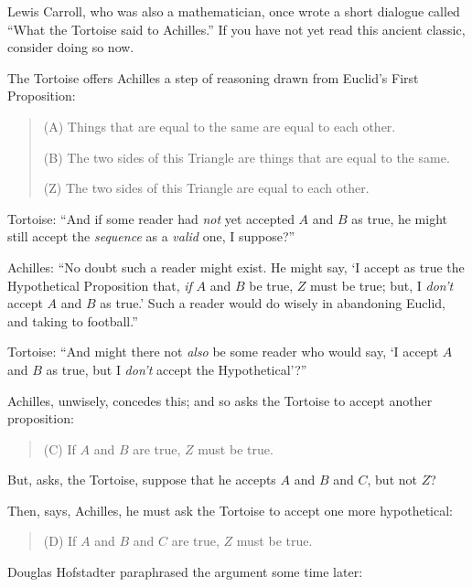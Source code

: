 \myendsectiontext


\bigskip


{
 Lewis Carroll, who was also a mathematician, once wrote a short
dialogue called ``What the Tortoise said to
Achilles.'' If you have not yet read this ancient
classic, consider doing so now. }

{
 The Tortoise offers Achilles a step of reasoning drawn from
Euclid's First Proposition:}

\begin{quotation}
{
 (A) Things that are equal to the same are equal to each other.}

{
 (B) The two sides of this Triangle are things that are equal to
the same.}

{
  (Z) The two sides of this Triangle are equal to each other.}
\end{quotation}

{
 Tortoise: ``And if some reader had \textit{not}
yet accepted $A$ and $B$ as true, he might still accept the
\textit{sequence} as a \textit{valid} one, I
suppose?''}

{
 Achilles: ``No doubt such a reader might exist.
He might say, `I accept as true the Hypothetical
Proposition that, \textit{if} $A$ and $B$ be true, $Z$ must be true; but, I
\textit{don't} accept $A$ and $B$ as true.'
Such a reader would do wisely in abandoning Euclid, and taking to
football.''}

{
 Tortoise: ``And might there not \textit{also} be
some reader who would say, `I accept $A$ and $B$ as true,
but I \textit{don't} accept the
Hypothetical'?''}

{
 Achilles, unwisely, concedes this; and so asks the Tortoise to
accept another proposition:}

\begin{quotation}
{
  (C) If $A$ and $B$ are true, $Z$ must be true.}
\end{quotation}

{
 But, asks, the Tortoise, suppose that he accepts $A$ and $B$ and $C$,
but not $Z$?}

{
 Then, says, Achilles, he must ask the Tortoise to accept one more
hypothetical:}

\begin{quotation}
{
  (D) If $A$ and $B$ and $C$ are true, $Z$ must be true.}
\end{quotation}

{
 Douglas Hofstadter paraphrased the argument some time later:}

